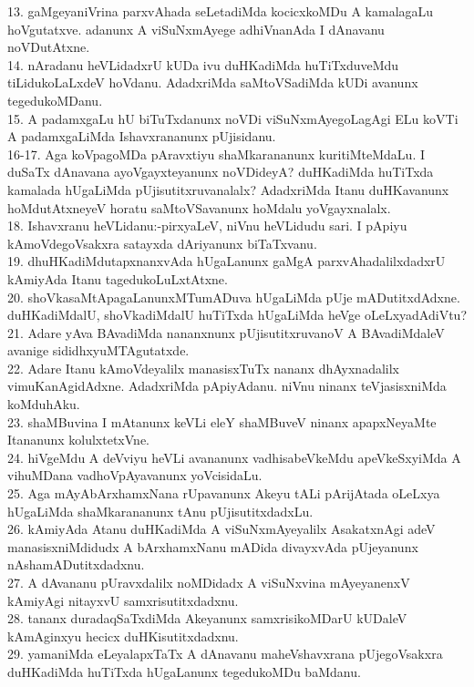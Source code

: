 \documentclass{article}
\begin{document}
13. gaMgeyaniVrina parxvAhada seLetadiMda kocicxkoMDu A kamalagaLu hoVgutatxve. adanunx A viSuNxmAyege adhiVnanAda I dAnavanu noVDutAtxne.\\
14. nAradanu heVLidadxrU kUDa ivu duHKadiMda huTiTxduveMdu tiLidukoLaLxdeV hoVdanu. AdadxriMda saMtoVSadiMda kUDi avanunx tegedukoMDanu.\\
15. A padamxgaLu hU biTuTxdanunx noVDi viSuNxmAyegoLagAgi ELu koVTi A padamxgaLiMda Ishavxrananunx pUjisidanu.\\
16-17. Aga koVpagoMDa pAravxtiyu shaMkarananunx kuritiMteMdaLu. I duSaTx dAnavana ayoVgayxteyanunx noVDideyA? duHKadiMda huTiTxda kamalada hUgaLiMda pUjisutitxruvanalalx? AdadxriMda Itanu duHKavanunx hoMdutAtxneyeV horatu saMtoVSavanunx hoMdalu yoVgayxnalalx.\\
18. Ishavxranu heVLidanu:-pirxyaLeV, niVnu heVLidudu sari. I pApiyu kAmoVdegoVsakxra satayxda dAriyanunx biTaTxvanu.\\
19. dhuHKadiMdutapxnanxvAda hUgaLanunx gaMgA parxvAhadalilxdadxrU kAmiyAda Itanu tagedukoLuLxtAtxne.\\
20. shoVkasaMtApagaLanunxMTumADuva hUgaLiMda pUje mADutitxdAdxne. duHKadiMdalU, shoVkadiMdalU huTiTxda hUgaLiMda heVge oLeLxyadAdiVtu?\\
21. Adare yAva BAvadiMda nananxnunx pUjisutitxruvanoV A BAvadiMdaleV avanige sididhxyuMTAgutatxde.\\
22. Adare Itanu kAmoVdeyalilx manasisxTuTx nananx dhAyxnadalilx vimuKanAgidAdxne. AdadxriMda pApiyAdanu. niVnu ninanx teVjasisxniMda koMduhAku.\\
23. shaMBuvina I mAtanunx keVLi eleY shaMBuveV ninanx apapxNeyaMte Itananunx kolulxtetxVne.\\
24. hiVgeMdu A deVviyu heVLi avananunx vadhisabeVkeMdu apeVkeSxyiMda A vihuMDana vadhoVpAyavanunx yoVcisidaLu.\\
25. Aga mAyAbArxhamxNana rUpavanunx Akeyu tALi pArijAtada oLeLxya hUgaLiMda shaMkarananunx tAnu pUjisutitxdadxLu.\\
26. kAmiyAda Atanu duHKadiMda A viSuNxmAyeyalilx AsakatxnAgi adeV manasisxniMdidudx A bArxhamxNanu mADida divayxvAda pUjeyanunx nAshamADutitxdadxnu.\\
27. A dAvananu pUravxdalilx noMDidadx A viSuNxvina mAyeyanenxV kAmiyAgi nitayxvU samxrisutitxdadxnu.\\
28. tananx duradaqSaTxdiMda Akeyanunx samxrisikoMDarU kUDaleV kAmAginxyu hecicx duHKisutitxdadxnu.\\
29. yamaniMda eLeyalapxTaTx A dAnavanu maheVshavxrana pUjegoVsakxra duHKadiMda huTiTxda hUgaLanunx tegedukoMDu baMdanu.\\
\end{document}
